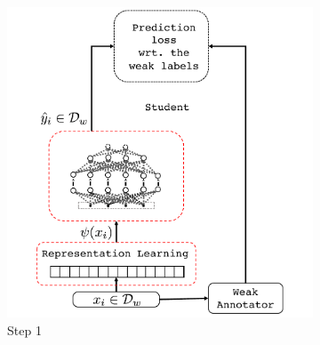 \begin{figure}[!t]%
    \centering
    \begin{subfigure}[t]{0.572\textwidth}
        \centering
        \includegraphics[width=\textwidth]{03-part-02/chapter-05/figs_and_tables/fig_fwl_step_1.pdf}
        \caption{\label{fig:step1}Step 1}
    \end{subfigure}%
    ~
    \begin{subfigure}[t]{0.44\textwidth}
        \centering

\end{subfigure}
\end{figure}
